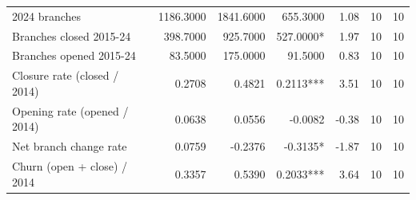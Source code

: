 \begin{tabular}{lrrrrrr}
2024 branches & 1186.3000 & 1841.6000 & 655.3000 & 1.08 & 10 & 10 \\
Branches closed 2015-24 & 398.7000 & 925.7000 & 527.0000* & 1.97 & 10 & 10 \\
Branches opened 2015-24 & 83.5000 & 175.0000 & 91.5000 & 0.83 & 10 & 10 \\
Closure rate (closed / 2014) & 0.2708 & 0.4821 & 0.2113*** & 3.51 & 10 & 10 \\
Opening rate (opened / 2014) & 0.0638 & 0.0556 & -0.0082 & -0.38 & 10 & 10 \\
Net branch change rate & 0.0759 & -0.2376 & -0.3135* & -1.87 & 10 & 10 \\
Churn (open + close) / 2014 & 0.3357 & 0.5390 & 0.2033*** & 3.64 & 10 & 10 \\
\bottomrule
\end{tabular}

